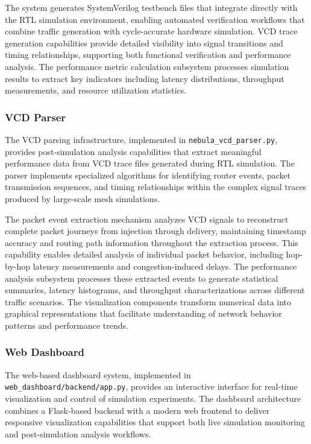 \documentclass[12pt,letterpaper]{article}
\begin{document}
The system generates SystemVerilog testbench files that integrate directly with the RTL simulation environment, enabling automated verification workflows that combine traffic generation with cycle-accurate hardware simulation. VCD trace generation capabilities provide detailed visibility into signal transitions and timing relationships, supporting both functional verification and performance analysis. The performance metric calculation subsystem processes simulation results to extract key indicators including latency distributions, throughput measurements, and resource utilization statistics.

\subsubsection{VCD Parser}

The VCD parsing infrastructure, implemented in \texttt{nebula\_vcd\_parser.py}, provides post-simulation analysis capabilities that extract meaningful performance data from VCD trace files generated during RTL simulation. The parser implements specialized algorithms for identifying router events, packet transmission sequences, and timing relationships within the complex signal traces produced by large-scale mesh simulations.

The packet event extraction mechanism analyzes VCD signals to reconstruct complete packet journeys from injection through delivery, maintaining timestamp accuracy and routing path information throughout the extraction process. This capability enables detailed analysis of individual packet behavior, including hop-by-hop latency measurements and congestion-induced delays. The performance analysis subsystem processes these extracted events to generate statistical summaries, latency histograms, and throughput characterizations across different traffic scenarios. The visualization components transform numerical data into graphical representations that facilitate understanding of network behavior patterns and performance trends.

\subsubsection{Web Dashboard}

The web-based dashboard system, implemented in \texttt{web\_dashboard/backend/app.py}, provides an interactive interface for real-time visualization and control of simulation experiments. The dashboard architecture combines a Flask-based backend with a modern web frontend to deliver responsive visualization capabilities that support both live simulation monitoring and post-simulation analysis workflows.
\end{document}
